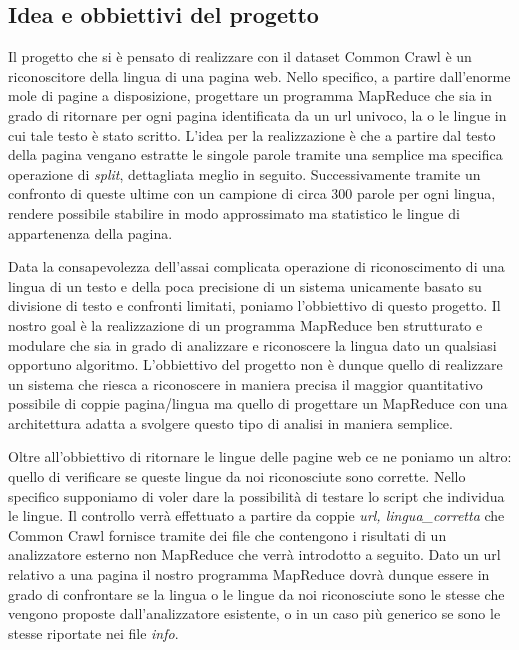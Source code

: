 \documentclass{article}
\newcommand{\MR}{MapReduce}
\newcommand{\info}{\textit{info}}
\newcommand{\CC}{Common Crawl}
\begin{document}
\subsection{Idea e obbiettivi del progetto}
Il progetto che si è pensato di realizzare con il dataset \CC{} è un riconoscitore della lingua di una pagina web. Nello specifico, a partire dall'enorme mole di pagine a disposizione, progettare un programma \MR{} che sia in grado di ritornare per ogni pagina identificata da un url univoco, la o le lingue in cui tale testo è stato scritto. L'idea per la realizzazione è che a partire dal testo della pagina vengano estratte le singole parole tramite una semplice ma specifica operazione di \textit{split}, dettagliata meglio in seguito. Successivamente tramite un confronto di queste ultime con un campione di circa 300 parole per ogni lingua, rendere possibile stabilire in modo approssimato ma statistico le lingue di appartenenza della pagina.

Data la consapevolezza dell'assai complicata operazione di riconoscimento di una lingua di un testo e della poca precisione di un sistema unicamente basato su divisione di testo e confronti limitati, poniamo l'obbiettivo di questo progetto. Il nostro goal è la realizzazione di un programma \MR{} ben strutturato e modulare che sia in grado di analizzare e riconoscere la lingua dato un qualsiasi opportuno algoritmo.
L'obbiettivo del progetto non è dunque quello di realizzare un sistema che riesca a riconoscere in maniera precisa il maggior quantitativo possibile di coppie pagina/lingua ma quello di progettare un \MR{} con una architettura adatta a svolgere questo tipo di analisi in maniera semplice.

Oltre all'obbiettivo di ritornare le lingue delle pagine web ce ne poniamo un altro: quello di verificare se queste lingue da noi riconosciute sono corrette. Nello specifico supponiamo di voler dare la possibilità di testare lo script che individua le lingue. Il controllo verrà effettuato a partire da coppie \textit{\textlangle url, lingua\_corretta\textrangle} che \CC{} fornisce tramite dei file che contengono i risultati di un analizzatore esterno non \MR{}  che verrà introdotto a seguito. Dato un url relativo a una pagina il nostro programma \MR{} dovrà dunque essere in grado di confrontare se la lingua o le lingue da noi riconosciute sono le stesse che vengono proposte dall'analizzatore esistente, o in un caso più generico se sono le stesse riportate nei file \info{}.

\end{document}
